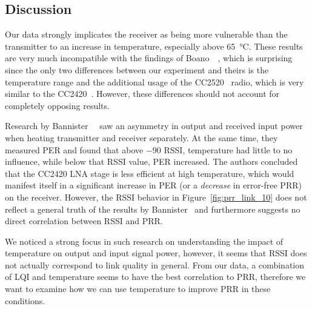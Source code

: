 \subsection{Discussion}

Our data strongly implicates the receiver as being more vulnerable than the transmitter to an increase in temperature, especially above \SI{65}{\celsius}.
These results are very much incompatible with the findings of Boano~\etal~\cite{Boano2013}, which is surprising since the only two differences between our experiment and theirs is the temperature range and the additional usage of the CC2520~\cite{cc2520} radio, which is very similar to the CC2420~\cite{cc2420}.
However, these differences should not account for completely opposing results.

Research by Bannister~\etal~\cite{Bannister2008} saw an asymmetry in output and received input power when heating transmitter and receiver separately.
At the same time, they measured \ac{PER} and found that above \SI{-90}{\dBm} \ac{RSSI}, temperature had little to no influence, while below that \ac{RSSI} value, \ac{PER} increased.
The authors concluded that the CC2420 \acl{LNA} stage is less efficient at high temperature, which would manifest itself in a significant increase in \ac{PER} (or a \emph{decrease} in error-free \ac{PRR}) on the receiver.
However, the \ac{RSSI} behavior in Figure~\ref{fig:prr_link_10} does not reflect a general truth of the results by Bannister~\etal{} and furthermore suggests no direct correlation between \ac{RSSI} and \ac{PRR}.

We noticed a strong focus in such research on understanding the impact of temperature on output and input signal power, however, it seems that \ac{RSSI} does not actually correspond to link quality in general.
From our data, a combination of \ac{LQI} and temperature seems to have the best correlation to \ac{PRR}, therefore we want to examine how we can use temperature to improve \ac{PRR} in these conditions.

